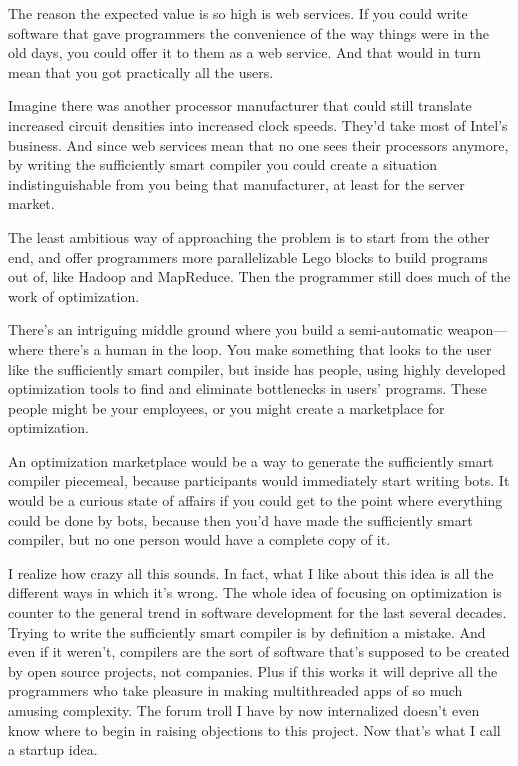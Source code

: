 The reason the expected value is so high is web services. If you could
write software that gave programmers the convenience of the way things
were in the old days, you could offer it to them as a web service. And
that would in turn mean that you got practically all the users.

Imagine there was another processor manufacturer that could still
translate increased circuit densities into increased clock speeds.
They'd take most of Intel's business. And since web services mean that
no one sees their processors anymore, by writing the sufficiently smart
compiler you could create a situation indistinguishable from you being
that manufacturer, at least for the server market.

The least ambitious way of approaching the problem is to start from the
other end, and offer programmers more parallelizable Lego blocks to
build programs out of, like Hadoop and MapReduce. Then the programmer
still does much of the work of optimization.

There's an intriguing middle ground where you build a semi-automatic
weapon---where there's a human in the loop. You make something that
looks to the user like the sufficiently smart compiler, but inside has
people, using highly developed optimization tools to find and eliminate
bottlenecks in users' programs. These people might be your employees, or
you might create a marketplace for optimization.

An optimization marketplace would be a way to generate the sufficiently
smart compiler piecemeal, because participants would immediately start
writing bots. It would be a curious state of affairs if you could get to
the point where everything could be done by bots, because then you'd
have made the sufficiently smart compiler, but no one person would have
a complete copy of it.

I realize how crazy all this sounds. In fact, what I like about this
idea is all the different ways in which it's wrong. The whole idea of
focusing on optimization is counter to the general trend in software
development for the last several decades. Trying to write the
sufficiently smart compiler is by definition a mistake. And even if it
weren't, compilers are the sort of software that's supposed to be
created by open source projects, not companies. Plus if this works it
will deprive all the programmers who take pleasure in making
multithreaded apps of so much amusing complexity. The forum troll I have
by now internalized doesn't even know where to begin in raising
objections to this project. Now that's what I call a startup idea.

